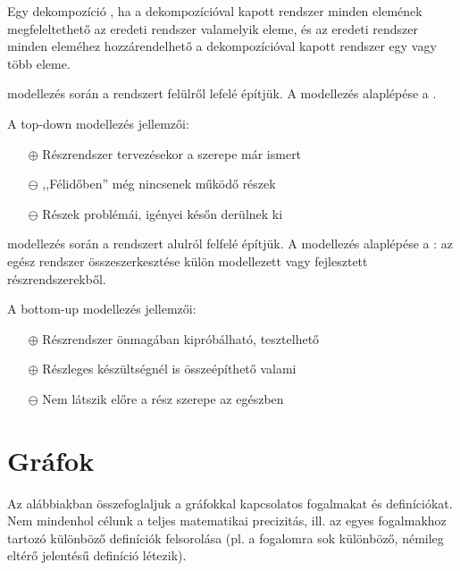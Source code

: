 \begin{definicio}
	Egy dekompozíció , ha a dekompozícióval kapott rendszer minden elemének megfeleltethető az eredeti rendszer valamelyik eleme, és az eredeti rendszer minden eleméhez hozzárendelhető a dekompozícióval kapott rendszer egy vagy több eleme.
\end{definicio}

\begin{definicio}
	 modellezés során a rendszert felülről lefelé építjük. A modellezés alaplépése a .
\end{definicio}

A top-down modellezés jellemzői:

\begin{itemize}
\item[$\oplus$] Részrendszer tervezésekor a szerepe már ismert
\item[$\ominus$] ,,Félidőben'' még nincsenek működő részek
\item[$\ominus$] Részek problémái, igényei későn derülnek ki
\end{itemize}

\begin{definicio}
	 modellezés során a rendszert alulról felfelé építjük. A modellezés alaplépése a : az egész rendszer összeszerkesztése külön modellezett vagy fejlesztett részrendszerekből.
\end{definicio}

A bottom-up modellezés jellemzői:

\begin{itemize}
\item[$\oplus$] Részrendszer önmagában kipróbálható, tesztelhető
\item[$\oplus$] Részleges készültségnél is összeépíthető valami
\item[$\ominus$] Nem látszik előre a rész szerepe az egészben
\end{itemize}

\section{Gráfok}
\label{sec:graf}

Az alábbiakban összefoglaljuk a gráfokkal kapcsolatos fogalmakat és definíciókat. Nem mindenhol célunk a teljes matematikai precizitás, ill. az egyes fogalmakhoz tartozó különböző definíciók felsorolása (pl. a  fogalomra sok különböző, némileg eltérő jelentésű definíció létezik).


